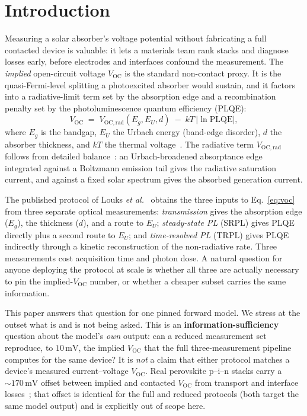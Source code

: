 \documentclass[11pt]{article}
\newcommand{\Voc}{V_{\mathrm{OC}}}
\newcommand{\Vocrad}{V_{\mathrm{OC,rad}}}
\newcommand{\mV}{\,\mathrm{mV}}
\begin{document}
\section{Introduction}

Measuring a solar absorber's voltage potential without fabricating a full contacted device is valuable: it lets a materials team rank stacks and diagnose losses early, before electrodes and interfaces confound the measurement. The \emph{implied} open-circuit voltage $\Voc$ is the standard non-contact proxy. It is the quasi-Fermi-level splitting a photoexcited absorber would sustain, and it factors into a radiative-limit term set by the absorption edge and a recombination penalty set by the photoluminescence quantum efficiency (PLQE):
\begin{equation}
\Voc \;=\; \Vocrad(E_g, E_U, d)\;-\;kT\,\bigl|\ln \mathrm{PLQE}\bigr|,
\label{eq:voc}
\end{equation}
where $E_g$ is the bandgap, $E_U$ the Urbach energy (band-edge disorder), $d$ the absorber thickness, and $kT$ the thermal voltage~\cite{ross1967,rau2007}. The radiative term $\Vocrad$ follows from detailed balance~\cite{shockleyqueisser1961}: an Urbach-broadened absorptance edge~\cite{urbach1953} integrated against a Boltzmann emission tail gives the radiative saturation current, and against a fixed solar spectrum gives the absorbed generation current.

The published protocol of Louks \emph{et al.}~\cite{louks2025} obtains the three inputs to Eq.~\eqref{eq:voc} from three separate optical measurements: \emph{transmission} gives the absorption edge ($E_g$), the thickness ($d$), and a route to $E_U$; \emph{steady-state PL} (SRPL) gives PLQE directly plus a second route to $E_U$; and \emph{time-resolved PL} (TRPL) gives PLQE indirectly through a kinetic reconstruction of the non-radiative rate. Three measurements cost acquisition time and photon dose. A natural question for anyone deploying the protocol at scale is whether all three are actually necessary to pin the implied-$\Voc$ number, or whether a cheaper subset carries the same information.

This paper answers that question for one pinned forward model. We stress at the outset what is and is not being asked. This is an \textbf{information-sufficiency} question about the model's \emph{own} output: can a reduced measurement set reproduce, to $10\mV$, the implied $\Voc$ that the full three-measurement pipeline computes for the same device? It is \emph{not} a claim that either protocol matches a device's measured current--voltage $\Voc$. Real perovskite p--i--n stacks carry a ${\sim}170\mV$ offset between implied and contacted $\Voc$ from transport and interface losses~\cite{louks2025}; that offset is identical for the full and reduced protocols (both target the same model output) and is explicitly out of scope here.
\end{document}
